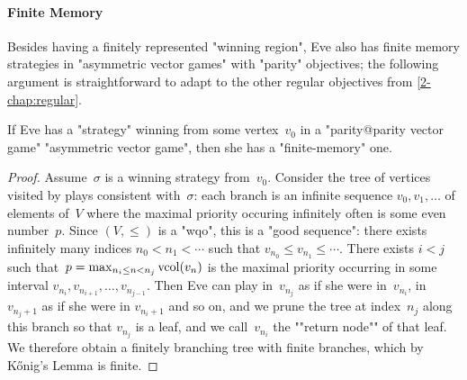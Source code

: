 \paragraph{Finite Memory} 
Besides having a finitely represented "winning region", Eve also has
finite memory strategies in "asymmetric vector games" with "parity"
objectives; the following argument is straightforward to adapt to
the other regular objectives from \cref{2-chap:regular}.
\begin{lemma}
\label{11-lem:finmem}
  If Eve has a "strategy" winning from some vertex~$v_0$ in a
  "parity@parity vector game" "asymmetric vector game", then she has a
  "finite-memory" one.
\end{lemma}
\begin{proof}
  Assume~$\sigma$ is a winning strategy from~$v_0$.  Consider the tree
  of vertices visited by plays consistent with~$\sigma$: each branch
  is an infinite sequence $v_0,v_1,\dots$ of elements of~$V$ where the
  maximal priority occuring infinitely often is some even number~$p$.
  Since $(V,{\leq})$ is a "wqo", this is a "good sequence": there
  exists infinitely many indices $n_0<n_1<\cdots$ such that
  $v_{n_0}\leq v_{n_1}\leq\cdots$.  There exists $i<j$ such
  that~$p=\max_{n_i\leq n<n_j}\mathrm{vcol}(v_n)$ is the maximal priority
  occurring in some interval $v_{n_i},v_{n_{i+1}},\dots,v_{n_{j-1}}$.
  Then Eve can play in~$v_{n_j}$ as if she were in~$v_{n_i}$, in
  $v_{n_j+1}$ as if she were in $v_{n_i+1}$ and so on, and we prune
  the tree at index~$n_j$ along this branch so that $v_{n_j}$ is a
  leaf, and we call~$v_{n_i}$ the ""return node"" of that leaf.  We
  therefore obtain a finitely branching tree with finite branches,
  which by K\H{o}nig's Lemma is finite.


\end{proof}
